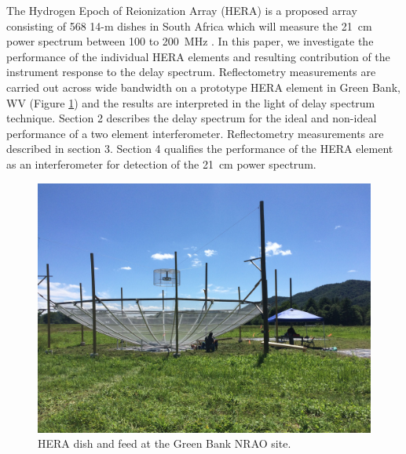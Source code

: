 \documentclass[12pt,preprint]{aastex}
\begin{document}
 The Hydrogen Epoch of Reionization Array (HERA) is a proposed array consisting of 568 14-m dishes in South Africa which will measure the 21~cm power spectrum between 100 to 200~MHz . In this paper, we investigate the performance of the individual HERA elements and resulting contribution of the instrument response to the delay spectrum. Reflectometry measurements  are carried out across wide bandwidth on a prototype HERA element in Green
Bank, WV (Figure \ref{fig:heradish}) and the results are interpreted in the light of delay spectrum technique. Section 2 describes the delay spectrum for the ideal and non-ideal performance of a two element interferometer. Reflectometry measurements are described in section 3. Section 4 qualifies the performance of the HERA element as an interferometer for detection of the 21~cm power spectrum.


\begin{figure}[ht!]
\centering
\includegraphics[trim={2cm 20cm 30cm 15cm},clip, totalheight=0.3\textheight]{plots/heradish.jpg}
\caption{HERA dish and feed at the Green Bank NRAO site.}
\label{fig:heradish}
\end{figure}
\end{document}
